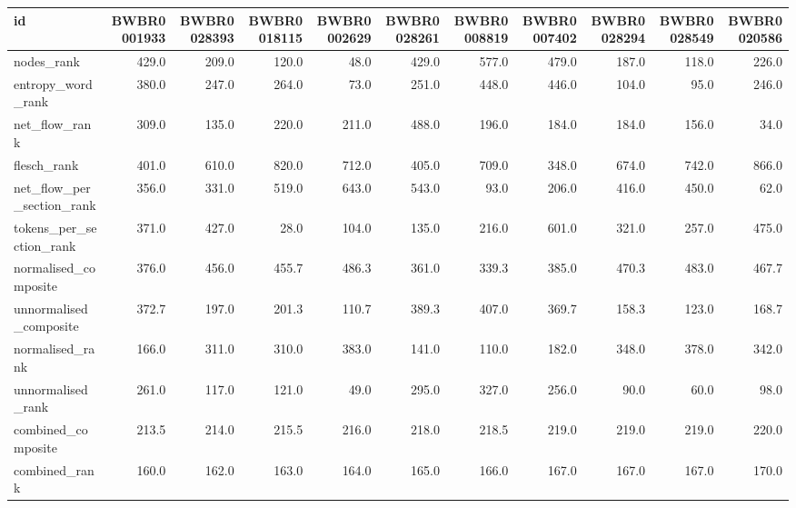 \begin{tabular}{lrrrrrrrrrr}
\toprule
id & BWBR0001933 & BWBR0028393 & BWBR0018115 & BWBR0002629 & BWBR0028261 & BWBR0008819 & BWBR0007402 & BWBR0028294 & BWBR0028549 & BWBR0020586 \\
\midrule
nodes\_rank & 429.0 & 209.0 & 120.0 & 48.0 & 429.0 & 577.0 & 479.0 & 187.0 & 118.0 & 226.0 \\
\cline{1-11}
entropy\_word\_rank & 380.0 & 247.0 & 264.0 & 73.0 & 251.0 & 448.0 & 446.0 & 104.0 & 95.0 & 246.0 \\
\cline{1-11}
net\_flow\_rank & 309.0 & 135.0 & 220.0 & 211.0 & 488.0 & 196.0 & 184.0 & 184.0 & 156.0 & 34.0 \\
\cline{1-11}
flesch\_rank & 401.0 & 610.0 & 820.0 & 712.0 & 405.0 & 709.0 & 348.0 & 674.0 & 742.0 & 866.0 \\
\cline{1-11}
net\_flow\_per\_section\_rank & 356.0 & 331.0 & 519.0 & 643.0 & 543.0 & 93.0 & 206.0 & 416.0 & 450.0 & 62.0 \\
\cline{1-11}
tokens\_per\_section\_rank & 371.0 & 427.0 & 28.0 & 104.0 & 135.0 & 216.0 & 601.0 & 321.0 & 257.0 & 475.0 \\
\cline{1-11}
normalised\_composite & 376.0 & 456.0 & 455.7 & 486.3 & 361.0 & 339.3 & 385.0 & 470.3 & 483.0 & 467.7 \\
\cline{1-11}
unnormalised\_composite & 372.7 & 197.0 & 201.3 & 110.7 & 389.3 & 407.0 & 369.7 & 158.3 & 123.0 & 168.7 \\
\cline{1-11}
normalised\_rank & 166.0 & 311.0 & 310.0 & 383.0 & 141.0 & 110.0 & 182.0 & 348.0 & 378.0 & 342.0 \\
\cline{1-11}
unnormalised\_rank & 261.0 & 117.0 & 121.0 & 49.0 & 295.0 & 327.0 & 256.0 & 90.0 & 60.0 & 98.0 \\
\cline{1-11}
combined\_composite & 213.5 & 214.0 & 215.5 & 216.0 & 218.0 & 218.5 & 219.0 & 219.0 & 219.0 & 220.0 \\
\cline{1-11}
combined\_rank & 160.0 & 162.0 & 163.0 & 164.0 & 165.0 & 166.0 & 167.0 & 167.0 & 167.0 & 170.0 \\
\cline{1-11}
\bottomrule
\end{tabular}
